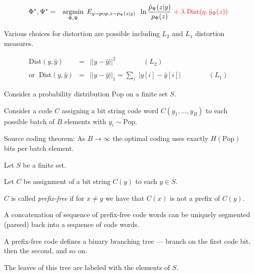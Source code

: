 {


{\huge
\begin{eqnarray*}
\Phi^*, \Psi^* & = & \operatorname*{argmin}_{\Phi,\Psi}\; E_{y\sim\mathrm{pop},z \sim \hat{p}_\Psi(z|y)}\;\; \ln \frac{ \hat{p}_\Psi(z|y)}{p_\Phi(z)}  \;{\color{red} +\; \lambda\;\mathrm{Dist}(y,\hat{y}_\Phi(z))}
\end{eqnarray*}
}

\vfill
Various choices for distortion are possible including $L_2$ and $L_1$ distortion measures.

\begin{eqnarray*}
\mathrm{Dist}(y,\hat{y}) & = & ||y-\hat{y}||^2 \hspace{4em}(L_2) \\
\\
\mathrm{or}\;\;\mathrm{Dist}(y,\hat{y}) & = & ||y-\hat{y}||_1 = \sum_i \;|y[i] - \hat{y}[i]| \hspace{4em}(L_1)
\end{eqnarray*}



}



Consider a probability distribution $\mathrm{Pop}$ on a finite set $S$.

\vfill
Consider a code $C$ assigning a bit string code word $C(y_1,\ldots,y_B)$ to each possible batch of $B$ elements with $y_i \sim \mathrm{Pop}$.

\vfill
Source coding theorem: As $B \rightarrow \infty$ the optimal coding uses exactly $H(\mathrm{Pop})$
bits per batch element.


Let $S$ be a finite set.

\vfill
Let $C$ be assignment of a bit string $C(y)$ to each $y \in S$.

\vfill
$C$ is called {\em prefix-free} if for $x \not = y$ we have that $C(x)$ is not a prefix of $C(y)$.

\vfill
A concatenation of sequence of prefix-free code words can be uniquely segmented (parsed) back into a sequence of code words.


A prefix-free code defines a binary branching tree --- branch on the first code bit, then the second, and so on.

\vfill
The leaves of this tree are labeled with the elements of $S$.

